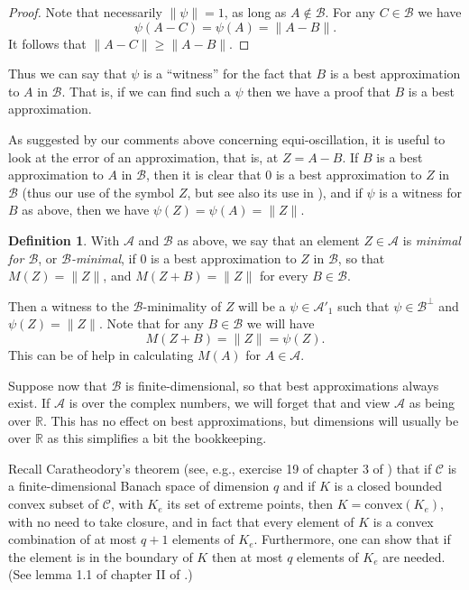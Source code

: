 \documentclass[12pt]{amsart}
\newcommand{\<}{\langle}
\renewcommand{\>}{\rangle}
\newcommand{\cA}{{\mathcal A}}
\newcommand{\cB}{{\mathcal B}}
\newcommand{\cC}{{\mathcal C}}
\newcommand{\cAo}{{\mathcal A}'_1}
\newcommand{\bR}{{\mathbb R}}
\theoremstyle{definition}   %
\newtheorem{definition}[theorem]{Definition}
\begin{document}
\begin{proof}
Note that necessarily $\|\psi\| = 1$, as long as $A \notin \cB$. For any $C \in \cB$ we have
\[
\psi(A - C) = \psi(A) = \|A-B\|  .
\]
It follows that $\|A-C\| \geq \|A-B\|$.
\end{proof}

Thus we can say that $\psi$ is a ``witness'' for the fact that $B$
is a best approximation to $A$ in $\cB$. That is, if we can find such
a $\psi$ then we have a proof that $B$ is a best approximation.

As suggested by our comments above concerning equi-oscillation,
it is useful to look at the error of an approximation, that is, at $Z = A-B$.
If $B$ is a best approximation to $A$ in $\cB$, then it is clear that $0$
is a best approximation to $Z$ in $\cB$ (thus our use of the symbol
$Z$, but see also its use in \cite{DMR, AMM}), and if $\psi$ is a witness for $B$ as
above, then we have $\psi(Z) = \psi(A) = \|Z\|$. 

\begin{definition}
\label{def-min}
With $\cA$ and $\cB$ as above, we say that an element $Z \in \cA$
is \emph{minimal for $\cB$}, or \emph{$\cB$-minimal}, if $0$ is a best approximation to $Z$ 
in $\cB$, so that $M(Z)=\|Z\|$, and $M(Z+B) = \|Z\|$ for every
$B \in \cB$.
\end{definition} 

Then a witness to the $\cB$-minimality of $Z$ will be a $\psi \in \cAo$
such that $\psi \in \cB^\perp$ and $\psi(Z) = \|Z\|$. Note that for
any $B \in \cB$ we will have 
\[
M(Z+B) = \|Z\| = \psi(Z).
\]
This can be of help in calculating $M(A)$ for $A \in \cA$.

Suppose now that $\cB$ is finite-dimensional, so that best approximations
always exist. If $\cA$ is over the complex numbers, we will forget that and
view $\cA$ as being over $\bR$. This has no effect on best approximations, 
but dimensions will usually be over $\bR$ as this simplifies a bit the bookkeeping.

Recall Caratheodory's theorem 
(see, e.g., exercise 19 of chapter 3 of \cite{Rdn}) that if $\cC$ 
is a finite-dimensional Banach space of dimension $q$
and if $K$ is a closed bounded convex subset of $\cC$, with $K_e$
its set of extreme points, then $K=\mathrm{convex}(K_e)$, with no need
to take closure, and in fact that every element of $K$ is a convex
combination of at most $q+1$ elements of $K_e$. Furthermore,
one can show that if the element is in the
boundary of $K$ then at most $q$ elements of $K_e$ are needed.
(See lemma 1.1 of chapter II of \cite{Sng}.)
\end{document}

